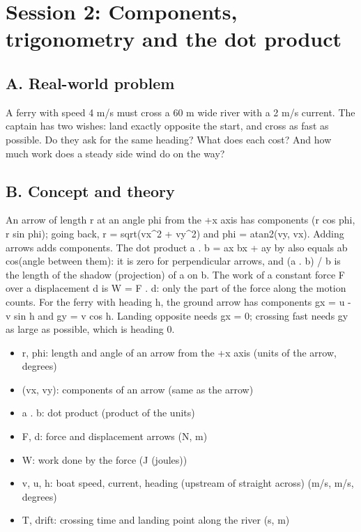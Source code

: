 \documentclass[11pt,a4paper]{article}
\begin{document}
\section{Session 2: Components, trigonometry and the dot product}

\subsection*{A. Real-world problem}
A ferry with speed 4 m/s must cross a 60 m wide river with a 2 m/s current. The captain has two wishes: land exactly opposite the start, and cross as fast as possible. Do they ask for the same heading? What does each cost? And how much work does a steady side wind do on the way?

\subsection*{B. Concept and theory}
An arrow of length r at an angle phi from the +x axis has components (r cos phi, r sin phi); going back, r = sqrt(vx\textasciicircum{}2 + vy\textasciicircum{}2) and phi = atan2(vy, vx). Adding arrows adds components. The dot product a . b = ax bx + ay by also equals \textbar{}a\textbar{}\textbar{}b\textbar{} cos(angle between them): it is zero for perpendicular arrows, and (a . b) / \textbar{}b\textbar{} is the length of the shadow (projection) of a on b. The work of a constant force F over a displacement d is W = F . d: only the part of the force along the motion counts. For the ferry with heading h, the ground arrow has components gx = u - v sin h and gy = v cos h. Landing opposite needs gx = 0; crossing fast needs gy as large as possible, which is heading 0.

\begin{itemize}[nosep]
\item r, phi: length and angle of an arrow from the +x axis (units of the arrow, degrees)
\item (vx, vy): components of an arrow (same as the arrow)
\item a . b: dot product (product of the units)
\item F, d: force and displacement arrows (N, m)
\item W: work done by the force (J (joules))
\item v, u, h: boat speed, current, heading (upstream of straight across) (m/s, m/s, degrees)
\item T, drift: crossing time and landing point along the river (s, m)
\end{itemize}
\end{document}
